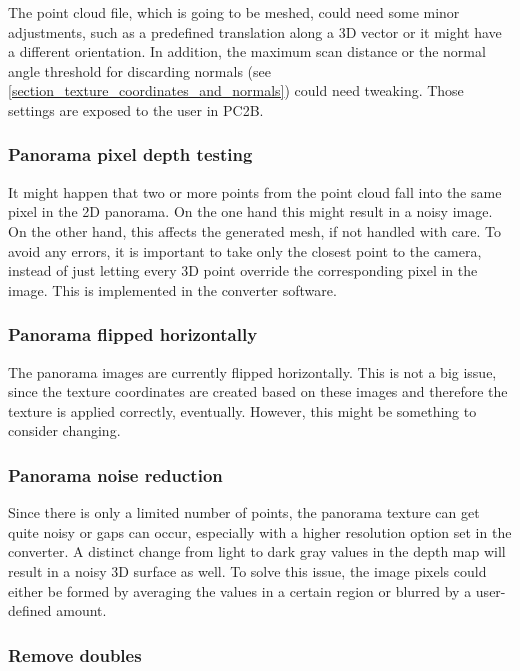 The point cloud file, which is going to be meshed, could need some minor adjustments, such as a predefined translation along a 3D vector or it might have a different orientation. In addition, the maximum scan distance or the normal angle threshold for discarding normals (see \ref{section_texture_coordinates_and_normals}) could need tweaking. Those settings are exposed to the user in PC2B.

\subsubsection{Panorama pixel depth testing}

It might happen that two or more points from the point cloud fall into the same pixel in the 2D panorama. On the one hand this might result in a noisy image. On the other hand, this affects the generated mesh, if not handled with care. To avoid any errors, it is important to take only the closest point to the camera, instead of just letting every 3D point override the corresponding pixel in the image. This is implemented in the converter software.

\subsubsection{Panorama flipped horizontally}

The panorama images are currently flipped horizontally. This is not a big issue, since the texture coordinates are created based on these images and therefore the texture is applied correctly, eventually. However, this might be something to consider changing.

\subsubsection{Panorama noise reduction}

Since there is only a limited number of points, the panorama texture can get quite noisy or gaps can occur, especially with a higher resolution option set in the converter. A distinct change from light to dark gray values in the depth map will result in a noisy 3D surface as well.
To solve this issue, the image pixels could either be formed by averaging the values in a certain region or blurred by a user-defined amount.

\subsubsection{Remove doubles}

